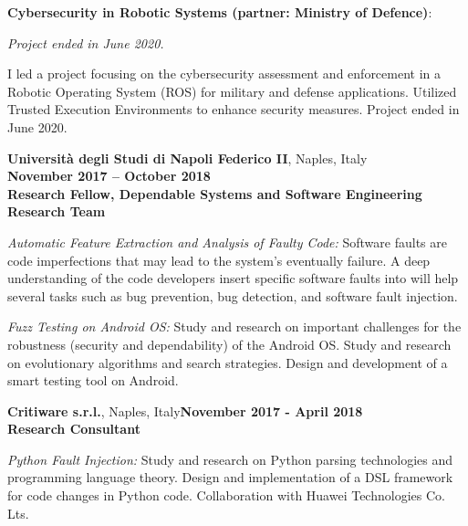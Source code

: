 \documentclass[margin,line]{resume}
\begin{document}
\begin{resume}
\begin{list2}
	\item \filbreak\textbf{Cybersecurity in Robotic Systems (partner: Ministry of Defence)}: 
	
	\emph{Project ended in June 2020.}	
		
	I led a project focusing on the cybersecurity assessment and enforcement in a Robotic Operating System (ROS) for military and defense applications. Utilized Trusted Execution Environments to enhance security measures. Project ended in June 2020.

\end{list2}



\textbf{Universit\`a degli Studi di Napoli Federico II}, Naples, Italy\\ \phantom{.} \hfill \textbf{November 2017 -- October 2018}\\
\textbf{Research Fellow, Dependable Systems and Software Engineering Research Team}\hfill 
\vspace{-3mm}\\\vspace{-1mm}
\begin{list2}
	\item \filbreak\textit{Automatic Feature Extraction and Analysis of Faulty Code:} Software faults are code imperfections that may lead to the system's eventually failure. A deep understanding of the code developers insert specific software faults into will help several tasks such as bug prevention, bug detection, and software fault injection.
    \item \filbreak\textit{Fuzz Testing on Android OS:} Study and research on important challenges for the robustness (security and dependability) of the Android OS. Study and research on evolutionary algorithms and search strategies. Design and development of a smart testing tool on Android.
\end{list2}

\textbf{Critiware s.r.l.}, Naples, Italy\hfill\textbf{November 2017 - April 2018}\\
\textbf{Research Consultant}\hfill 
\vspace{-3mm}\\\vspace{-1mm}
\begin{list2}
	\item \filbreak\textit{Python Fault Injection:} Study and research on Python parsing technologies and programming language theory. Design and implementation of a DSL framework for code changes in Python code. Collaboration with Huawei Technologies Co. Lts.
\end{list2}


\end{resume}
\end{document}
